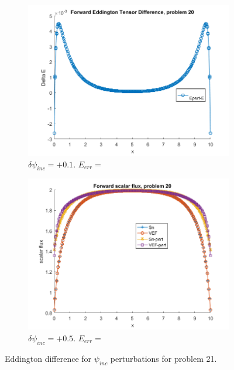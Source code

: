 \documentclass{article}
\begin{document}
\begin{figure}[H]
\centering
\begin{subfigure}{.5\textwidth}
  \centering
  \includegraphics[width=1\linewidth]{p21deltaEdBC0,1.png}
  \caption{$\delta\psi_{inc}=+0.1$. $E_{err}=$}
  \label{fig:sub1}
\end{subfigure}%
\begin{subfigure}{.5\textwidth}
  \centering
  \includegraphics[width=1\linewidth]{p21deltaEdBC0,5.png}
  \caption{$\delta\psi_{inc}=+0.5$. $E_{err}= $}
  \label{fig:sub2}
\end{subfigure}
\caption{Eddington difference for $\psi_{inc}$ perturbations for problem 21.}
\label{fig:test}
\end{figure}
\end{document}
